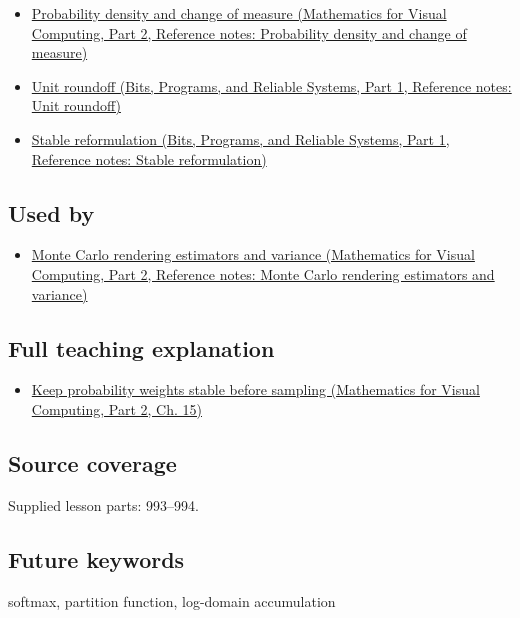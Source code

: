 \begin{itemize}
\tightlist
\item
  \href{../02-Mathematics-for-Visual-Computing-P02/main.pdf\#appendix-4815cd87ab8b}{Probability density and change of measure (Mathematics for Visual Computing, Part 2, Reference notes: Probability density and change of measure)}
\item
  \href{../01-Bits-Programs-and-Reliable-Systems-P01/main.pdf\#appendix-bc44f7b42f42}{Unit roundoff (Bits, Programs, and Reliable Systems, Part 1, Reference notes: Unit roundoff)}
\item
  \href{../01-Bits-Programs-and-Reliable-Systems-P01/main.pdf\#appendix-d7f8ba961670}{Stable reformulation (Bits, Programs, and Reliable Systems, Part 1, Reference notes: Stable reformulation)}
\end{itemize}

\subsection{Used by}\label{appendix-d580b422240f-used-by}

\hypertarget{appendix-d580b422240f-used-by}{}

\begin{itemize}
\tightlist
\item
  \href{../02-Mathematics-for-Visual-Computing-P02/main.pdf\#appendix-031e02bf28af}{Monte Carlo rendering estimators and variance (Mathematics for Visual Computing, Part 2, Reference notes: Monte Carlo rendering estimators and variance)}
\end{itemize}

\subsection{Full teaching explanation}\label{appendix-d580b422240f-full-teaching-explanation}

\hypertarget{appendix-d580b422240f-full-teaching-explanation}{}

\begin{itemize}
\tightlist
\item
  \href{../02-Mathematics-for-Visual-Computing-P02/main.pdf\#02-foundations-ii-ch031-keep-probability-weights-stable-before-sampling}{Keep probability weights stable before sampling (Mathematics for Visual Computing, Part 2, Ch. 15)}
\end{itemize}

\subsection{Source coverage}\label{appendix-d580b422240f-source-coverage}

\hypertarget{appendix-d580b422240f-source-coverage}{}

Supplied lesson parts: 993--994.

\subsection{Future keywords}\label{appendix-d580b422240f-future-keywords}

\hypertarget{appendix-d580b422240f-future-keywords}{}

softmax, partition function, log-domain accumulation
